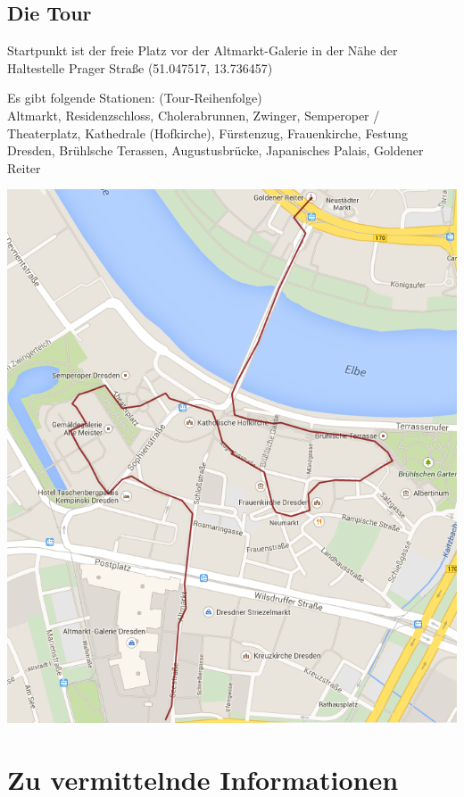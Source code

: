 \documentclass[a4paper,12pt]{report}
\begin{document}
\newpage

\section{Die Tour}
\begin{itemize*}
\item Startpunkt ist der freie Platz vor der Altmarkt-Galerie in der Nähe der Haltestelle Prager Straße (51.047517, 13.736457)
\item Es gibt folgende Stationen: (Tour-Reihenfolge)\\Altmarkt, Residenzschloss, Cholerabrunnen, Zwinger, Semperoper / Theaterplatz, Kathedrale (Hofkirche), Fürstenzug, Frauenkirche, Festung Dresden, Brühlsche Terassen, Augustusbrücke, Japanisches Palais, Goldener Reiter\\
\end{itemize*}
\includegraphics[width=\linewidth]{./tour.png}

\chapter{Zu vermittelnde Informationen}
\end{document}

